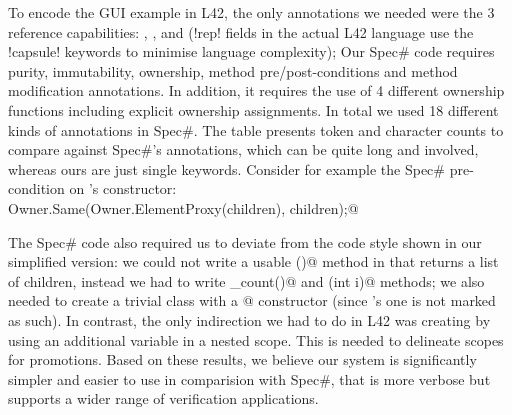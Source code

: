 To encode the GUI example in L42, the only annotations we needed were the 3 reference capabilities: \Q@mut@, \Q@read@, and \Q@capsule@ (\Q!rep! fields in the actual L42 language use the \Q!capsule! keywords to minimise language complexity);
Our Spec\# code requires purity, immutability, ownership, method pre/post-conditions and method modification annotations. In addition, it requires the use of 4 different ownership functions including explicit ownership assignments. In total we used 18 different kinds of annotations in Spec\#.
The table presents token and character counts to compare against Spec\#'s annotations, which can be quite long and involved, whereas ours are just single keywords.
Consider for example the Spec\# pre-condition on \Q@SafeMovable@'s constructor: \\
\indent\Q@requires Owner.Same(Owner.ElementProxy(children), children);@







\noindent The Spec\# code also required us to deviate from the code style shown in our simplified version: we could not write a usable \Q@children()@ method in \Q@Widget@ that returns a list of children, instead we had to write \Q@children_count()@ and \Q@children(int i)@ methods; we also needed to create a trivial class with a \Q@[Pure]@ constructor (since \Q@Object@'s one is not marked as such). In contrast, the only indirection we had to do in L42 was creating \Q@Box@es by using 
an additional variable in a nested scope.
This is needed to delineate scopes for promotions.
Based on these results, we believe our system is significantly simpler and easier to use
in comparision with Spec\#, that is more verbose but supports a wider range of verification applications.

